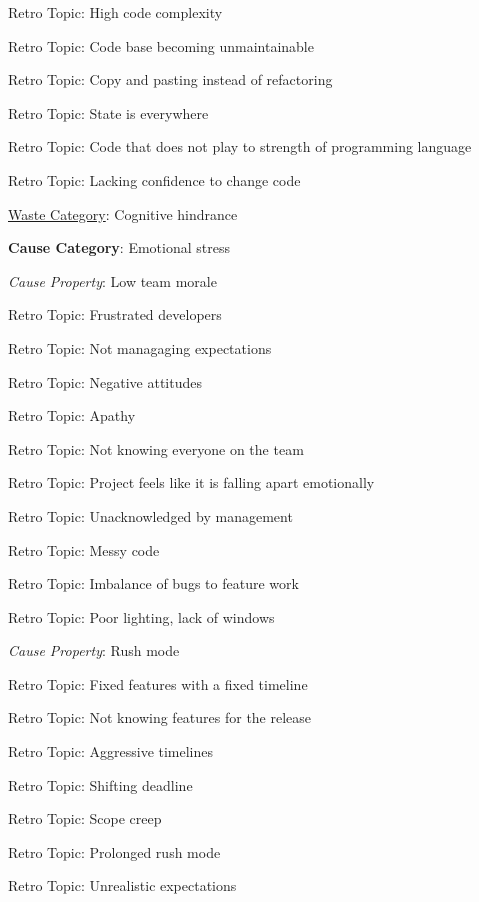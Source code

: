 \quad \quad \quad Retro Topic: High code complexity

\quad \quad \quad Retro Topic: Code base becoming unmaintainable

\quad \quad \quad Retro Topic: Copy and pasting instead of refactoring

\quad \quad \quad Retro Topic: State is everywhere

\quad \quad \quad Retro Topic: Code that does not play to strength of programming language

\quad \quad \quad Retro Topic: Lacking confidence to change code

\underline{Waste Category}: Cognitive hindrance

\quad \textbf{Cause Category}: Emotional stress

\quad \quad \textit{Cause Property}: Low team morale

\quad \quad \quad Retro Topic: Frustrated developers

\quad \quad \quad Retro Topic: Not managaging expectations

\quad \quad \quad Retro Topic: Negative attitudes

\quad \quad \quad Retro Topic: Apathy

\quad \quad \quad Retro Topic: Not knowing everyone on the team

\quad \quad \quad Retro Topic: Project feels like it is falling apart emotionally

\quad \quad \quad Retro Topic: Unacknowledged by management

\quad \quad \quad Retro Topic: Messy code

\quad \quad \quad Retro Topic: Imbalance of bugs to feature work

\quad \quad \quad Retro Topic: Poor lighting, lack of windows

\quad \quad \textit{Cause Property}: Rush mode

\quad \quad \quad Retro Topic: Fixed features with a fixed timeline

\quad \quad \quad Retro Topic: Not knowing features for the release

\quad \quad \quad Retro Topic: Aggressive timelines

\quad \quad \quad Retro Topic: Shifting deadline

\quad \quad \quad Retro Topic: Scope creep

\quad \quad \quad Retro Topic: Prolonged rush mode

\quad \quad \quad Retro Topic: Unrealistic expectations

